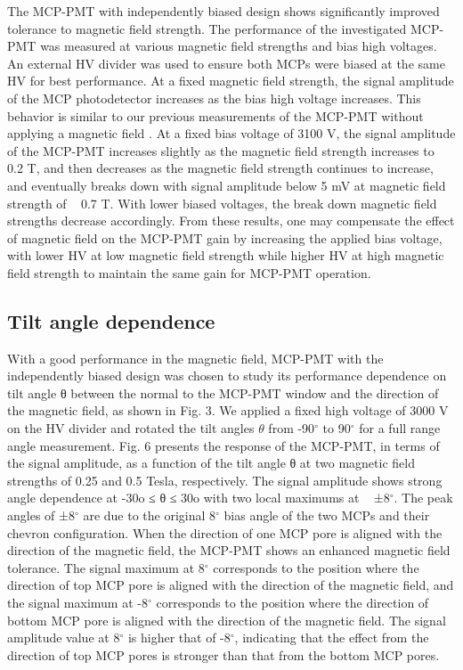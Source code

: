 \documentclass[preprint,5p]{elsarticle}
\begin{document}
The MCP-PMT with independently biased design shows significantly improved 
tolerance to magnetic field strength. The performance of the investigated 
MCP-PMT was measured at various magnetic field strengths and bias high 
voltages. An external HV divider was used to ensure both MCPs were biased at 
the same HV for best performance. At a fixed magnetic field strength, the 
signal amplitude of the MCP photodetector increases as the bias high voltage 
increases. This behavior is similar to our previous measurements of the MCP-PMT 
without applying a magnetic field \cite{21}. At a fixed bias voltage of 3100 V, 
the signal amplitude of the MCP-PMT increases slightly as the magnetic field 
strength increases to ~ 0.2 T, and then decreases as the magnetic field 
strength continues to increase, and eventually breaks down with signal 
amplitude below 5 mV at magnetic field strength of ~ 0.7 T. With lower biased 
voltages, the break down magnetic field strengths decrease accordingly. From 
these results, one may compensate the effect of magnetic field on the MCP-PMT 
gain by increasing the applied bias voltage, with lower HV at low magnetic 
field strength while higher HV at high magnetic field strength to maintain the 
same gain for MCP-PMT operation. 



\subsection{Tilt angle dependence} \label{}
With a good performance in the magnetic field, MCP-PMT with the independently 
biased design was chosen to study its performance dependence on tilt angle θ 
between the normal to the MCP-PMT window and the direction of the magnetic 
field, as shown in Fig. 3. We applied a fixed high voltage of 3000 V on the HV 
divider and rotated the tilt angles $\theta$ from -90$^{\circ}$ to 90$^{\circ}$ 
for a full range angle measurement. Fig. 6 presents the response of the 
MCP-PMT, in terms of the signal amplitude, as a function of the tilt angle θ at 
two magnetic field strengths of 0.25 and 0.5 Tesla, respectively.  The signal 
amplitude shows strong angle dependence at -30o ≤ θ ≤ 30o with two local 
maximums at ~ ±8$^{\circ}$.  The peak angles of ±8$^{\circ}$ are due to the 
original 8$^{\circ}$ bias angle of the two MCPs and their chevron 
configuration.  When the direction of one MCP pore is aligned with the 
direction of the magnetic field, the MCP-PMT shows an enhanced magnetic field 
tolerance. The signal maximum at 8$^{\circ}$ corresponds to the position where 
the direction of top MCP pore is aligned with the direction of the magnetic 
field, and the signal maximum at -8$^{\circ}$ corresponds to the position where 
the direction of bottom MCP pore is aligned with the direction of the magnetic 
field. The signal amplitude value at 8$^{\circ}$ is higher that of 
-8$^{\circ}$, indicating that the effect from the direction of top MCP pores is 
stronger than that from the bottom MCP pores.
\end{document}
